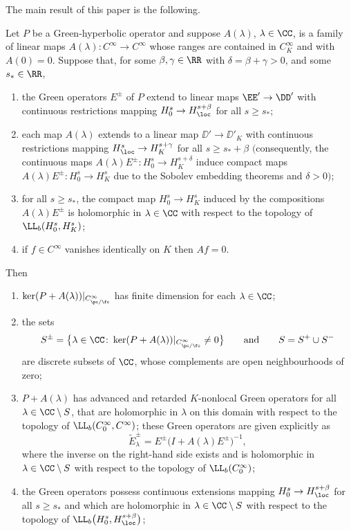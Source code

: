  The main result of this paper is the following.
 \begin{Theorem} \label{thm:GHpert}
 	Let $P$ be a Green-hyperbolic operator and
 	suppose $A(\lambda)$, $\lambda\in\CC$, is a family of linear maps $A(\lambda)\colon C^\infty\to C^\infty$ whose ranges are contained in $C^\infty_K$ and with $A(0)=0$. Suppose that,
 	for some $\beta,\gamma\in \RR$ with $\delta=\beta+\gamma>0$, and some $s_*\in \RR$,
 	\begin{enumerate}\itemsep=0pt
 		\item[$(a)$] the Green operators $E^\pm$ of $P$ extend to linear maps
 		$\EE'\to \DD'$ with continuous restrictions mapping $H^s_0\to H^{s+\beta}_\loc$ for all $s\ge s_*$;
 		\item[$(b)$] each map $A(\lambda)$ extends to a linear map $\DD'\to\DD'_K$ with continuous restrictions mapping $H^s_\loc\to H^{s+\gamma}_K$ for all $s\ge s_*+\beta$
 		$($consequently, the continuous maps $A(\lambda)E^\pm\colon H_0^s\to H_K^{s+\delta}$ induce
 		compact maps $A(\lambda)E^\pm\colon H_0^s\to H_K^{s}$ due to the Sobolev embedding theorems and $\delta>0)$;
 		\item[$(c)$] for all $s\ge s_*$, the compact map $H^s_0\to H^s_K$ induced by the compositions $A(\lambda)E^\pm$ is holomorphic in $\lambda\in\CC$ with respect to the topology of $\LL_b(H^s_0,H^s_K)$;
 		\item[$(d)$] if $f\in C^\infty$ vanishes identically on $K$ then $Af=0$.
 	\end{enumerate}
 	Then
 	\begin{enumerate}\renewcommand{\labelenumi}{(\Alph{enumi}).}
 		\item[$(A)$] $\ker (P+ A(\lambda))|_{C^\infty_{\pc/\fc}}$ has finite dimension
 		for each $\lambda\in\CC$;
 		\item[$(B)$]%
 the sets
 		\begin{equation*}
 			S^\pm = \big\{\lambda\in \CC\colon \ker (P+ A(\lambda))|_{C^\infty_{\pc/\fc}}\neq 0\big\} \qquad \text{and}\qquad
 			S = S^+\cup S^-
 		\end{equation*}
 		are discrete subsets of $\CC$, whose complements are open neighbourhoods of zero;
 		\item[$(C)$]%
 $P+A(\lambda)$ has advanced and retarded $K$-nonlocal Green operators for all $\lambda\in\CC\setminus S$, that are holomorphic in $\lambda$ on this domain with respect to the topology of $\LL_b(C_0^\infty, C^\infty)$; these Green operators are given explicitly as
 		\begin{equation*}
 			\tilde{E}_{\lambda}^\pm = E^\pm \big(I+A(\lambda)E^\pm\big)^{-1},
 		\end{equation*}
 		where the inverse on the right-hand side exists and is holomorphic in $\lambda\in \CC\setminus S$
 		with respect to the topology of $\LL_b(C_0^\infty)$;
 		\item[$(D)$]%
 the Green operators
 		possess continuous extensions mapping $H^s_0\to H^{s+\beta}_\loc$ for all $s\ge s_*$ and which are holomorphic in $\lambda\in\CC\setminus S$ with respect to the topology of $\LL_b\big(H^s_0,H^{s+\beta}_\loc\big)$;
 		

\end{enumerate}
\end{Theorem}
